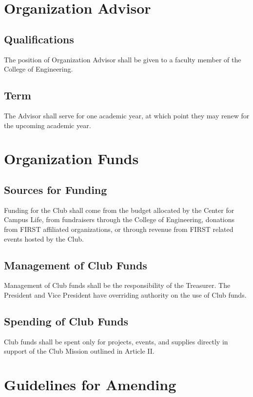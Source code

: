 \documentclass[english,11pt]{article}
\begin{document}
\section{Organization Advisor}

\subsection{Qualifications}
The position of Organization Advisor shall be given to a faculty member of the College of Engineering.

\subsection{Term}
The Advisor shall serve for one academic year, at which point they may renew for the upcoming academic year.

\section{Organization Funds}

\subsection{Sources for Funding}
Funding for the Club shall come from the budget allocated by the Center for Campus Life, from fundraisers through the College of Engineering, donations from FIRST affiliated organizations, or through revenue from FIRST related events hosted by the Club.

\subsection{Management of Club Funds}
Management of Club funds shall be the responsibility of the Treasurer.
The President and Vice President have overriding authority on the use of Club funds.

\subsection{Spending of Club Funds}
Club funds shall be spent only for projects, events, and supplies directly in support of the Club Mission outlined in Article II.

\section{Guidelines for Amending}
\end{document}
